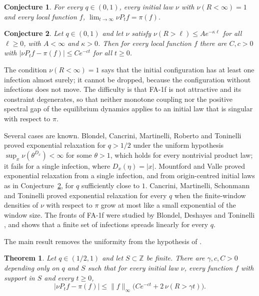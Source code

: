 \documentclass[11pt]{amsart}
\newtheorem{theorem}{Theorem}[section]
\newtheorem{conjecture}{Conjecture}
\theoremstyle{remark}
\newcommand{\Z}{\mathbb{Z}}
\begin{document}
\begin{conjecture}\label{conj:convergence}
For every $q\in(0,1)$, every initial law $\nu$ with $\nu(R<\infty)=1$ and every local function $f$,
$\lim_{t\to\infty}\nu P_tf=\pi(f)$.
\end{conjecture}

\begin{conjecture}\label{conj:rate}
Let $q\in(0,1)$ and let $\nu$ satisfy $\nu(R>\ell)\le Ae^{-\kappa\ell}$ for all $\ell\ge0$, with $A<\infty$ and
$\kappa>0$. Then for every local function $f$ there are $C,c>0$ with $|\nu P_tf-\pi(f)|\le Ce^{-ct}$ for all
$t\ge0$.
\end{conjecture}

The condition $\nu(R<\infty)=1$ says that the initial configuration has at least one infection almost surely; it
cannot be dropped, because the configuration without infections does not move. The difficulty is that FA-1f is not
attractive and its constraint degenerates, so that neither monotone coupling nor the positive spectral gap of the
equilibrium dynamics \cite{CMRT08} applies to an initial law that is singular with respect to $\pi$.

Several cases are known. Blondel, Cancrini, Martinelli, Roberto and Toninelli \cite{BCMRT13} proved exponential
relaxation for $q>1/2$ under the uniform hypothesis $\sup_x\nu(\theta^{D_x})<\infty$ for some $\theta>1$, which holds
for every nontrivial product law; it fails for a single infection, where $D_x(\eta)=|x|$. Mountford and Valle
\cite{MV19} proved exponential relaxation from a single infection, and from origin-centred initial laws as in
Conjecture~\ref{conj:rate}, for $q$ sufficiently close to $1$. Cancrini, Martinelli, Schonmann and Toninelli
\cite{CMST10} proved exponential relaxation for every $q$ when the finite-window densities of $\nu$ with respect to
$\pi$ grow at most like a small exponential of the window size. The fronts of FA-1f were studied by Blondel,
Deshayes and Toninelli \cite{BDT19}, and \cite[Theorem~6.2]{MST25} shows that a finite set of infections spreads
linearly for every $q$.

The main result removes the uniformity from the hypothesis of \cite{BCMRT13}.

\begin{theorem}\label{thm:main}
Let $q\in(1/2,1)$ and let $S\subset\Z$ be finite. There are $\gamma,c,C>0$ depending only on $q$ and $S$ such that
for every initial law $\nu$, every function $f$ with support in $S$ and every $t\ge0$,
\begin{equation}\label{eq:main}
|\nu P_tf-\pi(f)|\le\|f\|_\infty\bigl(Ce^{-ct}+2\,\nu(R>\gamma t)\bigr).
\end{equation}
\end{theorem}
\end{document}
